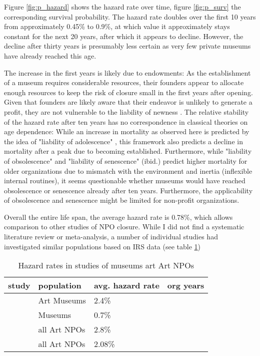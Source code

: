 \documentclass[12pt]{article}
\begin{document}
Figure \ref{fig:p_hazard} shows the hazard rate over time, figure \ref{fig:p_surv} the corresponding survival probability.
The hazard rate doubles over the first 10 years from approximately 0.45\% to 0.9\%, at which value it approximately stays constant for the next 20 years, after which it appears to decline.
However, the decline after thirty years is presumably less certain as very few private museums have already reached this age.


The increase in the first years is likely due to endowments: As the establishment of a museum requires considerable resources, their founders appear to allocate enough resources to keep the risk of closure small in the first years after opening.
Given that founders are likely aware that their endeavor is unlikely to generate a profit, they are not vulnerable to the liability of newness \parencite{Stinchcombe_1965_structure}.
The relative stability of the hazard rate after ten years has no correspondence in classical theories on age dependence:
While an increase in mortality as observed here is predicted by the idea of "liability of adolescence" \parencite{Carroll_Khessina_2019_demography}, this framework also predicts a decline in mortality after a peak due to becoming established.
Furthermore, while "liability of obsolescence" and "liability of senescence" (ibid.) predict higher mortality for older organizations due to mismatch with the environment and inertia (inflexible internal routines), it seems questionable whether museums would have reached obsolescence or senescence already after ten years.
Furthermore, the applicability of obsolescence and senescence might be limited for non-profit organizations.


Overall the entire life span, the average hazard rate is 0.78\%, which allows comparison to other studies of NPO closure.
While I did not find a systematic literature review or meta-analysis, a number of individual studies had investigated similar populations based on IRS data (see table \ref{tbl:litreview}) 

\begin{table}[htbp]
\caption{\label{tbl:litreview}Hazard rates in studies of museums art Art NPOs}
\centering
\begin{tabular}{llll}
\hline
study & population & avg. hazard rate & org years\\
\hline
\cite{Hager_2001_vulnerability} & Art Museums & 2.4\% & \\
\cite{Gordon_etal_2013_insolvency} & Museums & 0.7\% & \\
\hline
\cite{Hager_2001_vulnerability} & all Art NPOs & 2.8\% & \\
\cite{Gordon_etal_2013_insolvency} & all Art NPOs & 2.08\% & \\
\hline
\end{tabular}
\end{table}
\end{document}
